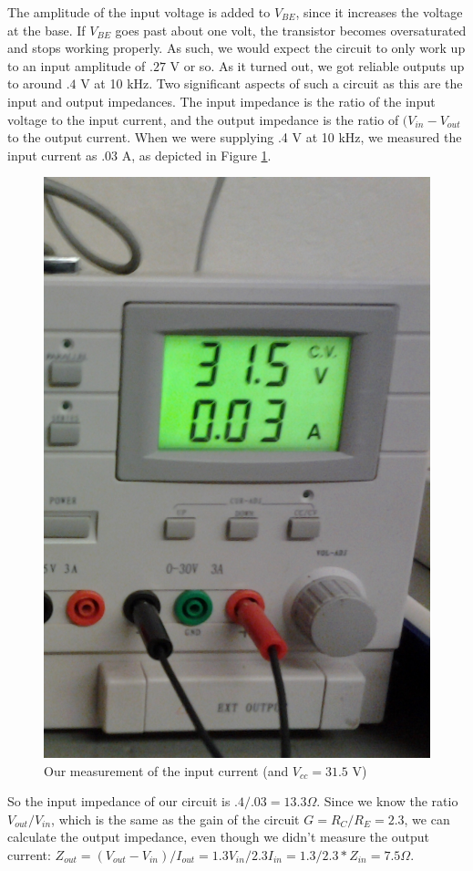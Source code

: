 \documentclass[11pt]{article}
\begin{document}
The amplitude of the input voltage is added to $V_{BE}$, since it increases the voltage at the base. If $V_{BE}$ goes past about
one volt, the transistor becomes oversaturated and stops working properly. As such, we would expect the circuit to only work up to
an input amplitude of $.27$ V or so. As it turned out, we got reliable outputs up to around $.4$ V at 10 kHz. Two significant
aspects of such a circuit as this are the input and output impedances. The input impedance is the ratio of the input voltage
to the input current, and the output impedance is the ratio of $(V_{in} - V_{out}$ to the output current. When we were supplying 
.4 V at 10 kHz, we measured the input current as .03 A, as depicted in Figure \ref{current}.
\begin{figure}
\includegraphics[scale=0.2]{right}
\caption{Our measurement of the input current (and $V_{cc}=31.5$ V)\label{current}}
\end{figure}
So the input impedance of our circuit is $.4/.03 = 13.3 \Omega$. Since we know the ratio $V_{out}/V_{in}$, which is the same
as the gain of the circuit $G = R_C / R_E = 2.3$, we can calculate the output impedance, even though we didn't measure the output
current: $Z_{out} = (V_{out} - V_{in}) / I_{out} = 1.3V_{in} / 2.3I_{in} = 1.3 / 2.3 * Z_{in} = 7.5 \Omega$.
\end{document}
